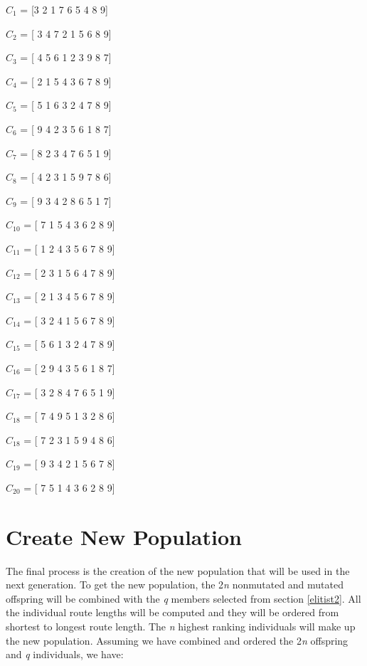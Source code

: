 $C_{1}$ = [3 2 1 7 6 5 4 8 9]\par 
$C_{2}$ = [ 3 4 7 2 1 5 6 8 9] \par 
$C_{3}$ = [ 4 5 6 1 2 3 9 8 7] \par 
$C_{4}$ = [ 2 1 5 4 3 6 7 8 9] \par
$C_{5}$ = [ 5 1 6 3 2 4 7 8 9] \par 
$C_{6}$ = [ 9 4 2 3 5 6 1 8 7] \par 
$C_{7}$ = [ 8 2 3 4 7 6 5 1 9] \par 
$C_{8}$ = [ 4 2 3 1 5 9 7 8 6] \par 
$C_{9}$ = [ 9 3 4 2 8 6 5 1 7] \par
$C_{10}$ = [ 7 1 5 4 3 6 2 8 9] \par 
$C_{11}$ = [ 1 2 4 3 5 6 7 8 9] \par 
$C_{12}$ = [ 2 3 1 5 6 4 7 8 9] \par 
$C_{13}$ = [ 2 1 3 4 5 6 7 8 9] \par 
$C_{14}$ = [ 3 2 4 1 5 6 7 8 9] \par 
$C_{15}$ = [ 5 6 1 3 2 4 7 8 9] \par 
$C_{16}$ = [ 2 9 4 3 5 6 1 8 7] \par 
$C_{17}$ = [ 3 2 8 4 7 6 5 1 9] \par 
$C_{18}$ = [ 7 4 9 5 1 3 2 8 6] \par 
$C_{18}$ = [ 7 2 3 1 5 9 4 8 6] \par 
$C_{19}$ = [ 9 3 4 2 1 5 6 7 8] \par
$C_{20}$ = [ 7 5 1 4 3 6 2 8 9] \par 

\section{Create New Population}
\indent \indent The final process is the creation of the new population that will be used in the next generation. To get the new population, the 2\emph{n} nonmutated and mutated offspring will be combined with the \emph{q} members selected from section \ref{elitist2}. All the individual route lengths will be computed and they will be ordered from shortest to longest route length. The \emph{n} highest ranking individuals will make up the new population. Assuming we have combined and ordered the 2\emph{n} offspring and \emph{q} individuals, we have: 

